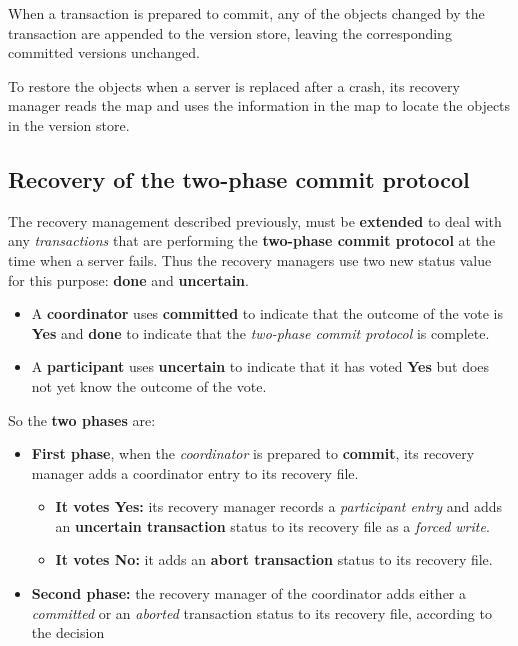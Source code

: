 When a transaction is prepared to commit, any of the objects changed by the transaction are appended to the version store, leaving the corresponding committed versions unchanged.

To restore the objects when a server is replaced after a crash, its recovery manager reads the map and uses the information in the map to locate the objects in the version store.

\subsection{Recovery of the two-phase commit protocol}
The recovery management described previously, must be \textbf{extended} to deal with any \textit{transactions} that are performing the \textbf{two-phase commit protocol} at the time when a server fails. Thus the recovery managers use two new status value for this purpose: \textbf{done} and \textbf{uncertain}.

\begin{itemize}
    \item A \textbf{coordinator} uses \textbf{committed} to indicate that the outcome of the vote is \textbf{Yes} and \textbf{done} to indicate that the \textit{two-phase commit protocol} is complete.
    \item A \textbf{participant} uses \textbf{uncertain} to indicate that it has voted \textbf{Yes} but does not yet know the outcome of the vote.
\end{itemize}
So the \textbf{two phases} are:
\begin{itemize}
    \item \textbf{First phase}, when the \textit{coordinator} is prepared to \textbf{commit}, its recovery manager adds a coordinator entry to its recovery file.
    \begin{itemize}
        \item \textbf{It votes Yes:} its recovery manager records a \textit{participant entry} and adds an \textbf{uncertain transaction} status to its recovery file as a \textit{forced write}.
        \item \textbf{It votes No:} it adds an \textbf{abort transaction} status to its recovery file.
    \end{itemize}
    \item \textbf{Second phase:} the recovery manager of the coordinator adds either a \textit{committed} or an \textit{aborted} transaction status to its recovery file, according to the decision
\end{itemize}
